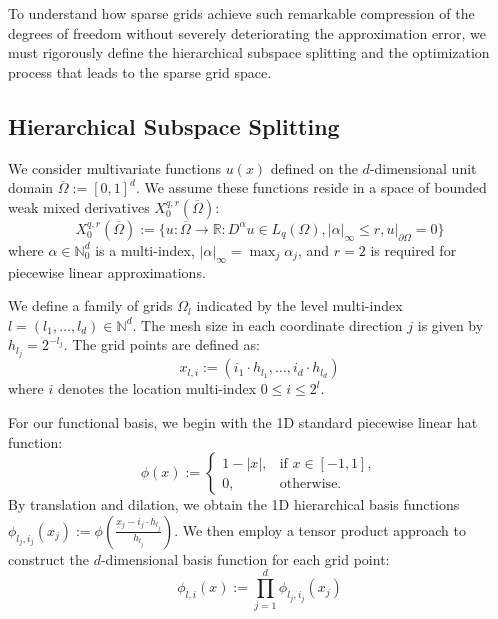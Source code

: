 \documentclass[12pt, a4paper]{article}
\begin{document}
To understand how sparse grids achieve such remarkable compression of the degrees of freedom without severely deteriorating the approximation error, we must rigorously define the hierarchical subspace splitting and the optimization process that leads to the sparse grid space.

\subsection{Hierarchical Subspace Splitting}
We consider multivariate functions $u(x)$ defined on the $d$-dimensional unit domain $\overline{\Omega} := [0,1]^d$. We assume these functions reside in a space of bounded weak mixed derivatives $X_0^{q,r}(\overline{\Omega})$:
\begin{equation}
X_0^{q,r}(\overline{\Omega}) := \{u : \overline{\Omega} \rightarrow \mathbb{R} : D^\alpha u \in L_q(\Omega), |\alpha|_\infty \le r, u|_{\partial\Omega} = 0\}
\end{equation}
where $\alpha \in \mathbb{N}_0^d$ is a multi-index, $|\alpha|_\infty = \max_j \alpha_j$, and $r=2$ is required for piecewise linear approximations. 

We define a family of grids $\Omega_l$ indicated by the level multi-index $l = (l_1, \dots, l_d) \in \mathbb{N}^d$. The mesh size in each coordinate direction $j$ is given by $h_{l_j} = 2^{-l_j}$. The grid points are defined as:
\begin{equation}
x_{l,i} := (i_1 \cdot h_{l_1}, \dots, i_d \cdot h_{l_d})
\end{equation}
where $i$ denotes the location multi-index $0 \le i \le 2^l$.

For our functional basis, we begin with the 1D standard piecewise linear hat function:
\begin{equation}
\phi(x) := \begin{cases} 1 - |x|, & \text{if } x \in [-1,1], \\ 0, & \text{otherwise.} \end{cases}
\end{equation}
By translation and dilation, we obtain the 1D hierarchical basis functions $\phi_{l_j, i_j}(x_j) := \phi\left( \frac{x_j - i_j \cdot h_{l_j}}{h_{l_j}} \right)$. We then employ a tensor product approach to construct the $d$-dimensional basis function for each grid point:
\begin{equation}
\phi_{l,i}(x) := \prod_{j=1}^d \phi_{l_j, i_j}(x_j)
\end{equation}
\end{document}
